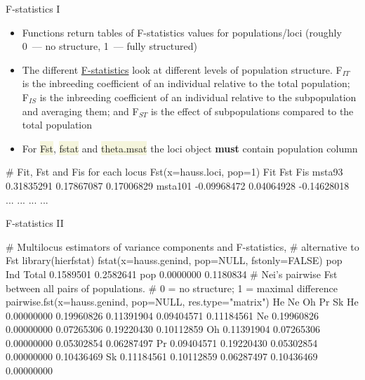\documentclass[compress, ucs, xelatex, 11pt, xcolor=svgnames, aspectratio=169,
	hyperref={
		bookmarks=true,
		unicode=true,
		colorlinks=true,
		pdftitle={Molecular data in R},
		plainpages=false,
		pdfauthor={Vojtech Zeisek},
		pdfsubject={Course about phylogeny and evolution in R},
		pdfcreator={XeLaTeX},
		pdfkeywords={R, evolution, phylogeny, molecular data},
		linkcolor=Crimson, %
		anchorcolor=Magenta, %
		citecolor=Magenta, %
		filecolor=Magenta, %
		menucolor=Magenta, %
		urlcolor=DodgerBlue, %
		pdftex},
	url={hyphens, lowtilde} %
	]{beamer}
\renewcommand{\texttt}[1]{\colorbox{Beige}{{\ttfamily #1}}}
\begin{document}
\begin{frame}[fragile]{F-statistics I}
	\begin{itemize}
		\item Functions return tables of F-statistics values for populations/loci (roughly 0~--- no structure, 1~--- fully structured)
		\item The different \href{https://en.wikipedia.org/wiki/F-statistics}{F-statistics} look at different levels of population structure. F$_{IT}$ is the inbreeding coefficient of an individual relative to the total population; F$_{IS}$ is the inbreeding coefficient of an individual relative to the subpopulation and averaging them; and F$_{ST}$ is the effect of subpopulations compared to the total population
		\item For \texttt{Fst}, \texttt{fstat} and \texttt{theta.msat} the loci object \textbf{must} contain population column
	\end{itemize}
	\begin{spluscode}
    # Fit, Fst and Fis for each locus
    Fst(x=hauss.loci, pop=1)
                    Fit        Fst         Fis
    msta93   0.31835291 0.17867087  0.17006829
    msta101 -0.09968472 0.04064928 -0.14628018
        ...         ...        ...         ...
	\end{spluscode}
\end{frame}

\begin{frame}[fragile]{F-statistics II}
	\begin{spluscode}
    # Multilocus estimators of variance components and F-statistics,
    # alternative to Fst
    library(hierfstat)
    fstat(x=hauss.genind, pop=NULL, fstonly=FALSE)
                pop       Ind
    Total 0.1589501 0.2582641
    pop   0.0000000 0.1180834
    # Nei's pairwise Fst between all pairs of populations.
    # 0 = no structure; 1 = maximal difference
    pairwise.fst(x=hauss.genind, pop=NULL, res.type="matrix")
               He         Ne         Oh         Pr         Sk
    He 0.00000000 0.19960826 0.11391904 0.09404571 0.11184561
    Ne 0.19960826 0.00000000 0.07265306 0.19220430 0.10112859
    Oh 0.11391904 0.07265306 0.00000000 0.05302854 0.06287497
    Pr 0.09404571 0.19220430 0.05302854 0.00000000 0.10436469
    Sk 0.11184561 0.10112859 0.06287497 0.10436469 0.00000000
	\end{spluscode}
\end{frame}
\end{document}
